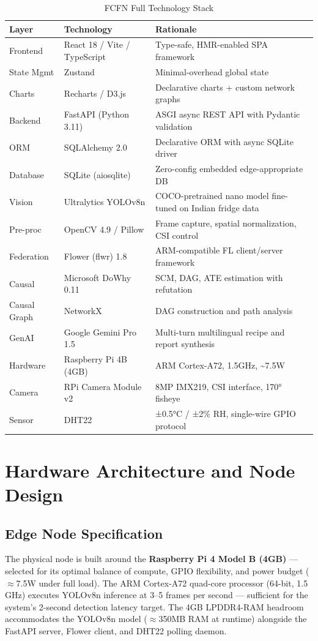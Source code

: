\documentclass[12pt,a4paper]{report}
\begin{document}
\begin{table}[ht]
\centering
\caption{FCFN Full Technology Stack}
\label{tab:techstack}
\begin{tabularx}{\textwidth}{L{0.16\textwidth} L{0.28\textwidth} L{0.51\textwidth}}
\toprule
\textbf{Layer} & \textbf{Technology} & \textbf{Rationale} \\
\midrule
Frontend & React 18 / Vite / TypeScript & Type-safe, HMR-enabled SPA framework \\
State Mgmt & Zustand & Minimal-overhead global state \\
Charts & Recharts / D3.js & Declarative charts + custom network graphs \\
Backend & FastAPI (Python 3.11) & ASGI async REST API with Pydantic validation \\
ORM & SQLAlchemy 2.0 & Declarative ORM with async SQLite driver \\
Database & SQLite (aiosqlite) & Zero-config embedded edge-appropriate DB \\
Vision & Ultralytics YOLOv8n & COCO-pretrained nano model fine-tuned on Indian fridge data \\
Pre-proc & OpenCV 4.9 / Pillow & Frame capture, spatial normalization, CSI control \\
Federation & Flower (flwr) 1.8 & ARM-compatible FL client/server framework \\
Causal & Microsoft DoWhy 0.11 & SCM, DAG, ATE estimation with refutation \\
Causal Graph & NetworkX & DAG construction and path analysis \\
GenAI & Google Gemini Pro 1.5 & Multi-turn multilingual recipe and report synthesis \\
Hardware & Raspberry Pi 4B (4GB) & ARM Cortex-A72, 1.5GHz, \textasciitilde7.5W \\
Camera & RPi Camera Module v2 & 8MP IMX219, CSI interface, 170° fisheye \\
Sensor & DHT22 & ±0.5°C / ±2\% RH, single-wire GPIO protocol \\
\bottomrule
\end{tabularx}
\end{table}

\section{Hardware Architecture and Node Design}

\subsection{Edge Node Specification}
The physical node is built around the \textbf{Raspberry Pi 4 Model B (4GB)} — selected for its optimal balance of compute, GPIO flexibility, and power budget ($\approx$7.5W under full load). The ARM Cortex-A72 quad-core processor (64-bit, 1.5 GHz) executes YOLOv8n inference at 3--5 frames per second — sufficient for the system's 2-second detection latency target. The 4GB LPDDR4-RAM headroom accommodates the YOLOv8n model ($\approx$350MB RAM at runtime) alongside the FastAPI server, Flower client, and DHT22 polling daemon.
\end{document}
